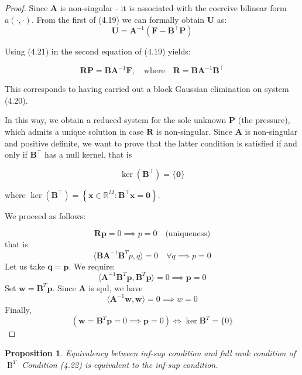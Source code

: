 \documentclass[11pt]{book}
\newtheorem{proposition}{Proposition}
\begin{document}
\begin{proof}
    
Since $\mathbf{A}$ is non-singular - it is associated with the coercive bilinear form $a(\cdot, \cdot)$. From the first of (4.19) we can formally obtain $\mathbf{U}$ as:
\begin{equation}
\mathbf{U} = \mathbf{A}^{-1} (\mathbf{F} - \mathbf{B}^{\top} \mathbf{P})
\end{equation}

Using (4.21) in the second equation of (4.19) yields:

\[
\mathbf{RP} = \mathbf{BA}^{-1} \mathbf{F}, \quad \text{where} \quad \mathbf{R} = \mathbf{BA}^{-1} \mathbf{B}^{\top}
\]

This corresponds to having carried out a block Gaussian elimination on system (4.20).

In this way, we obtain a reduced system for the sole unknown $\mathbf{P}$ (the pressure), which admits a unique solution in case $\mathbf{R}$ is non-singular. Since $\mathbf{A}$ is non-singular and positive definite, we want to prove that the latter condition is satisfied if and only if $\mathbf{B}^{\top}$ has a null kernel, that is

\begin{equation}
\operatorname{ker}(\mathbf{B}^{\top}) = \{\mathbf{0}\}
\end{equation}

where $\operatorname{ker}(\mathbf{B}^{\top}) = \left\{ \mathbf{x} \in \mathbb{R}^{M} : \mathbf{B}^{\top} \mathbf{x} = \mathbf{0} \right\}$.

We proceed as follows:

\[
\mathbf{R}\mathbf{p} = 0 \implies p = 0 \quad \text{(uniqueness)}
\]
that is
\[
\langle \mathbf{B}\mathbf{A}^{-1} \mathbf{B}^T p, q \rangle = 0 \quad \forall q \implies p = 0
\]
Let us take \( \mathbf{q} = \mathbf{p} \). We require:
\[
\langle \mathbf{A}^{-1} \mathbf{B}^T \mathbf{p}, \mathbf{B}^T \mathbf{p} \rangle = 0 \implies \mathbf{p} = 0
\]
Set \( \mathbf{w} = \mathbf{B}^T \mathbf{p} \). Since \( \mathbf{A} \) is spd, we have
\[
\langle \mathbf{A}^{-1} \mathbf{w}, \mathbf{w} \rangle = 0 \implies w = 0
\]
Finally, 
\[
(\mathbf{w} = \mathbf{B}^T \mathbf{p} = 0 \implies \mathbf{p} = 0) \iff \ker \mathbf{B}^T = \{0\}
\]

\end{proof}

\begin{proposition}{Equivalency between inf-sup condition and full rank condition of $ \operatorname{B}^T $}
Condition (4.22) is equivalent to the inf-sup condition.
\end{proposition}
\end{document}
